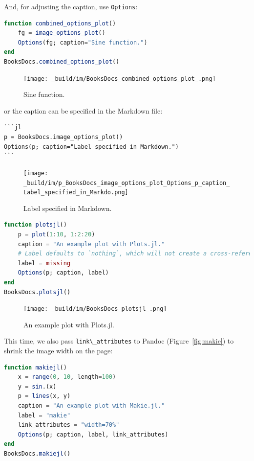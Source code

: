 \documentclass[
  notoc %
]{tufte-book}
\newcommand{\passthrough}[1]{#1}
\begin{document}
And, for adjusting the caption, use \passthrough{\lstinline!Options!}:

\begin{lstlisting}[language=Julia]
function combined_options_plot()
    fg = image_options_plot()
    Options(fg; caption="Sine function.")
end
BooksDocs.combined_options_plot()
\end{lstlisting}

\begin{figure}
\centering
\texttt{[image: \_build/im/BooksDocs\_combined\_options\_plot\_.png]}
\caption{Sine function.}
\end{figure}

or the caption can be specified in the Markdown file:

\begin{lstlisting}
```jl
p = BooksDocs.image_options_plot()
Options(p; caption="Label specified in Markdown.")
```
\end{lstlisting}

\begin{figure}
\centering
\texttt{[image: \_build/im/p\_BooksDocs\_image\_options\_plot\_Options\_p\_caption\_Label\_specified\_in\_Markdo.png]}
\caption{Label specified in Markdown.}
\end{figure}

\hfill\break

\begin{lstlisting}[language=Julia]
function plotsjl()
    p = plot(1:10, 1:2:20)
    caption = "An example plot with Plots.jl."
    # Label defaults to `nothing`, which will not create a cross-reference.
    label = missing
    Options(p; caption, label)
end
BooksDocs.plotsjl()
\end{lstlisting}

\begin{figure}
\centering
\texttt{[image: \_build/im/BooksDocs\_plotsjl\_.png]}
\caption{An example plot with Plots.jl.}
\end{figure}

This time, we also pass \passthrough{\lstinline!link\_attributes!} to
Pandoc (Figure~\ref{fig:makie}) to shrink the image width on the page:

\begin{lstlisting}[language=Julia]
function makiejl()
    x = range(0, 10, length=100)
    y = sin.(x)
    p = lines(x, y)
    caption = "An example plot with Makie.jl."
    label = "makie"
    link_attributes = "width=70%"
    Options(p; caption, label, link_attributes)
end
BooksDocs.makiejl()
\end{lstlisting}
\end{document}
